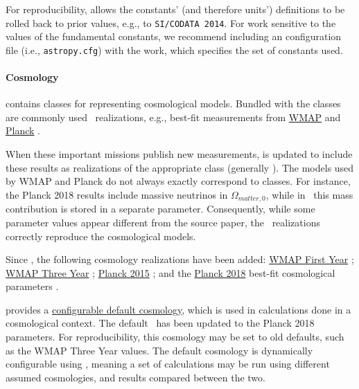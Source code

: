 \documentclass[modern]{aastex631}
\begin{document}
For reproducibility, \astropypkg allows the constants' (and therefore units')
definitions to be rolled back to prior values, e.g., to \texttt{SI/CODATA
2014}. For work sensitive to the values of the fundamental constants, we
recommend including an \astropypkg configuration file (i.e., \texttt{astropy.cfg})
with the work, which specifies the set of constants used.

\paragraph{Cosmology}

\astropycosmology contains classes for representing cosmological models. Bundled
with the classes are commonly used \astropyCosmology\ realizations, e.g.,
best-fit measurements from
\href{https://lambda.gsfc.nasa.gov/product/map/current/}{WMAP}
\citep{WMAP2003} and
\href{https://www.nasa.gov/mission_pages/planck}{Planck}
\citep{PlanckMission:2006}.

When these important missions publish new measurements, \astropycosmology is
updated to include these results as realizations of the appropriate class
(generally \astropyFlatLambdaCDM). The models used by WMAP and Planck do not
always exactly correspond to \astropycosmology classes. For instance, the Planck
2018 results \citep{Planck2018VI:2020} include massive neutrinos in
$\Omega_{matter,0}$, while in \astropyFlatLambdaCDM\ this mass contribution is
stored in a separate parameter. Consequently, while some parameter values appear
different from the source paper, the \astropyCosmology\ realizations correctly
reproduce the cosmological models.

Since \citet{astropy:2018}, the following cosmology realizations have been
added:
\href{http://docs.astropy.org/en/stable/api/astropy.cosmology.WMAP1.html}{WMAP First Year}
\citep{WMAP1Year:2003};
\href{http://docs.astropy.org/en/stable/api/astropy.cosmology.WMAP3.html}{WMAP
Three Year} \citep{WMAP3Year:2007};
\href{http://docs.astropy.org/en/stable/api/astropy.cosmology.Planck15.html}{Planck 2015}
\citep{Planck2015XIII:2016}; and the
\href{http://docs.astropy.org/en/stable/api/astropy.cosmology.Planck18.html}{Planck
2018} best-fit cosmological parameters \citep{Planck2018VI:2020}.

\astropypkg provides a
\href{http://docs.astropy.org/en/stable/api/astropy.cosmology.default_cosmology.html}{configurable
default cosmology}, which is used in calculations done in a cosmological
context. The default \astropyCosmology\ has been updated to the Planck 2018
parameters. For reproducibility, this cosmology may be set to old defaults, such
as the WMAP Three Year values. The default cosmology is dynamically configurable
using \astropyScienceState, meaning a set of calculations may be run using
different assumed cosmologies, and results compared between the two.
\end{document}
